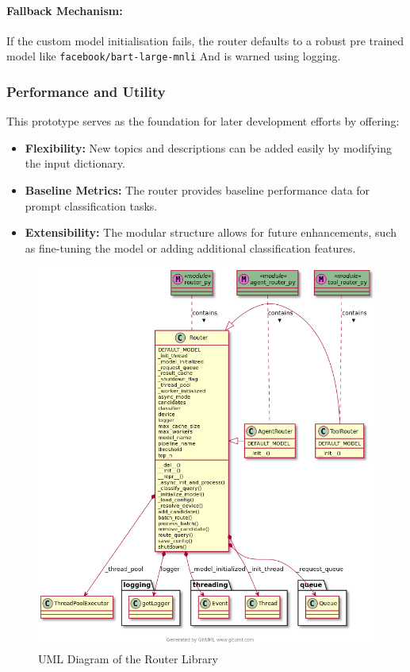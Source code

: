 \paragraph{Fallback Mechanism:} If the custom model initialisation fails, the router defaults to a robust pre trained model like \texttt{facebook/bart-large-mnli} And is warned using logging.

\subsubsection*{Performance and Utility}

This prototype serves as the foundation for later development efforts by offering:

\begin{itemize}
    \item \textbf{Flexibility:} New topics and descriptions can be added easily by modifying the input dictionary.
    \item \textbf{Baseline Metrics:} The router provides baseline performance data for prompt classification tasks.
    \item \textbf{Extensibility:} The modular structure allows for future enhancements, such as fine-tuning the model or adding additional classification features.
\end{itemize}




\begin{figure}[H]
    \centering
    \includegraphics[width=1.0\textwidth]{figures/UML.png}
    \caption{UML Diagram of the Router Library}
    \label{fig:uml_diagram}
\end{figure}




